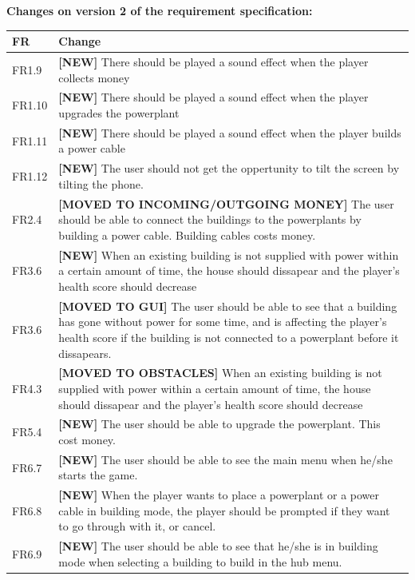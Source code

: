 	{\bf Changes on version 2 of the requirement specification:} \\
	\begin{tabular}{| p{1.5cm} | p{12cm} |}
		\hline
		\rowcolor{lightgray}
		{\bf FR} & {\bf Change} \\ \hline
		FR1.9 & {\bf \color{green} [NEW]} There should be played a sound effect when 
		the player collects money \\ \hline
		FR1.10 & {\bf \color{green} [NEW]} There should be played a sound effect when 
		the player upgrades the powerplant \\ \hline
		FR1.11 & {\bf \color{green} [NEW]} There should be played a sound effect when 
		the player builds a power cable \\ \hline
		FR1.12 & {\bf \color{green} [NEW]} The user should not get the oppertunity to 
		tilt the screen by tilting the phone. \\ \hline
		FR2.4 & {\bf \color{orange} [MOVED TO INCOMING/OUTGOING MONEY]} The user should 
		be able to connect the buildings to the powerplants by building a power cable. 
		Building cables costs money. \\ \hline
		FR3.6 & {\bf \color{green} [NEW]} When an existing building is not supplied 
		with power within a certain amount of time, the house should dissapear and the player's 
		health score should decrease \\ \hline
		FR3.6 & {\bf \color{orange} [MOVED TO GUI]} The user should be able to see 
		that a building has gone without power for some time, and is affecting the 
		player's health score if the building is not connected to a powerplant before it 
		dissapears. \\ \hline
		FR4.3 & {\bf \color{orange} [MOVED TO OBSTACLES]} When an existing building 
		is not supplied with power within a certain amount of time, the house should 
		dissapear and the player's health score should decrease \\ \hline
		FR5.4 & {\bf \color{green} [NEW]} The user should be able to upgrade the powerplant. 
		This cost money. \\ \hline
		FR6.7 & {\bf \color{green} [NEW]} The user should be able to see the main 
		menu when he/she starts the game. \\ \hline
		FR6.8 & {\bf \color{green} [NEW]} When the player wants to place a powerplant 
		or a power cable in building mode, the player should be prompted if they want to 
		go through with it, or cancel. \\ \hline
		FR6.9 & {\bf \color{green} [NEW]} The user should be able to see that he/she 
		is in building mode when selecting a building to build in the hub menu. \\ \hline
	\end{tabular}

